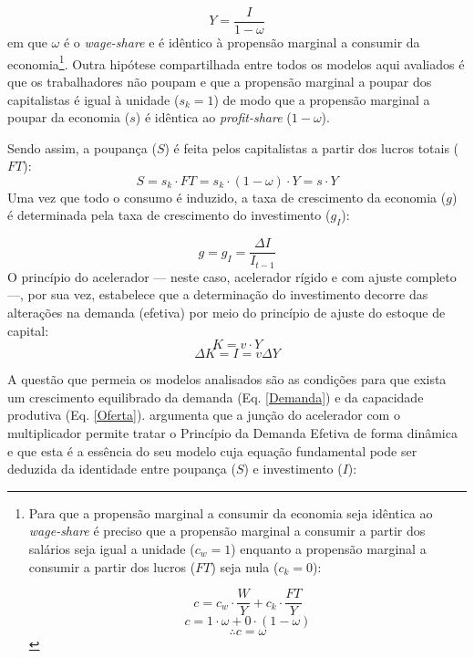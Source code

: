 \begin{equation}
\label{Demanda}
Y = \frac{I}{1-\omega}
\end{equation}
em que $\omega$ é o \textit{wage-share} e é idêntico à propensão marginal a consumir da economia\footnote{
	Para que a propensão marginal a consumir da economia seja idêntica ao \textit{wage-share} é preciso que a propensão marginal a consumir a partir dos salários seja igual  a unidade ($c_w = 1$) enquanto a propensão marginal a consumir a partir dos lucros ($FT$) seja nula ($c_k = 0$):
	
	$$
	c = c_w\cdot \frac{W}{Y} + c_k\cdot \frac{FT}{Y}
	$$
	$$
	c = 1\cdot \omega + 0\cdot (1-\omega)
	$$
	$$
	\therefore c = \omega
	$$
	
}.
Outra hipótese compartilhada entre todos os modelos aqui avaliados é que os trabalhadores não poupam e que a propensão marginal a poupar dos capitalistas é igual à unidade ($s_k = 1$) de modo que a propensão marginal a poupar da economia ($s$) é idêntica ao \textit{profit-share} ($1-\omega$).

Sendo assim, a poupança ($S$) é feita pelos capitalistas a partir dos lucros totais ($FT$):
$$
S = s_k\cdot FT = s_k\cdot (1-\omega)\cdot Y = s\cdot Y
$$
Uma vez que todo o consumo é induzido, a taxa de crescimento da economia ($g$) é determinada pela taxa de crescimento do investimento ($g_I$):

\begin{equation}
\label{crescimento_efetivo}
	g = g_I =  \frac{\Delta I}{I_{t-1}}
\end{equation}
O princípio do acelerador --- neste caso, acelerador rígido e com ajuste completo ---, por sua vez, estabelece que a determinação do investimento decorre das alterações na demanda (efetiva) por meio do princípio de ajuste do estoque de capital:
$$
K = v\cdot Y
$$
\begin{equation}
\Delta K = I = v\Delta Y
\end{equation}


A questão que permeia os modelos analisados são as condições para que exista um crescimento equilibrado da demanda (Eq. \ref{Demanda}) e da capacidade produtiva (Eq. \ref{Oferta}). 
\textcite{harrod_essay_1939} argumenta que a junção do acelerador com o multiplicador permite tratar o Princípio da Demanda Efetiva de forma dinâmica e que esta é a essência do seu modelo cuja equação fundamental pode ser deduzida da identidade entre poupança ($S$) e investimento ($I$):

